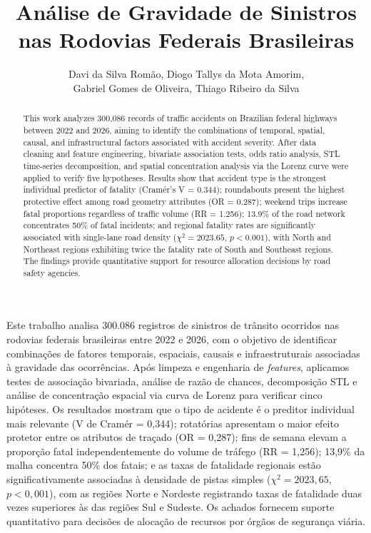 \documentclass[12pt]{article}
\title{Análise de Gravidade de Sinistros \\ 
nas Rodovias Federais Brasileiras}
\author{
  Davi da Silva Romão\inst{1},
  Diogo Tallys da Mota Amorim\inst{1},\\
  Gabriel Gomes de Oliveira\inst{1},
  Thiago Ribeiro da Silva\inst{1}
}
\begin{document}
\maketitle

\begin{abstract}
This work analyzes 300,086 records of traffic accidents on Brazilian
federal highways between 2022 and 2026, aiming to identify the
combinations of temporal, spatial, causal, and infrastructural factors
associated with accident severity. After data cleaning and feature
engineering, bivariate association tests, odds ratio analysis, STL
time-series decomposition, and spatial concentration analysis via the
Lorenz curve were applied to verify five hypotheses. Results show that
accident type is the strongest individual predictor of fatality
(Cramér's V = 0.344); roundabouts present the highest protective
effect among road geometry attributes (OR = 0.287); weekend trips
increase fatal proportions regardless of traffic volume
(RR = 1.256); 13.9\% of the road network concentrates 50\% of
fatal incidents; and regional fatality rates are significantly associated with single-lane road density ($\chi^2 = 2023.65$, $p < 0.001$), with North and Northeast regions exhibiting twice the fatality rate of South and Southeast regions.
The findings provide quantitative support for resource allocation
decisions by road safety agencies.
\end{abstract}

\begin{resumo}
Este trabalho analisa 300.086 registros de sinistros de trânsito
ocorridos nas rodovias federais brasileiras entre 2022 e 2026, com o
objetivo de identificar combinações de fatores temporais, espaciais,
causais e infraestruturais associadas à gravidade das ocorrências.
Após limpeza e engenharia de \textit{features}, aplicamos testes
de associação bivariada, análise de razão de chances, decomposição STL
e análise de concentração espacial via curva de Lorenz para verificar
cinco hipóteses. Os resultados mostram que o tipo de acidente é o
preditor individual mais relevante (V de Cramér = 0,344); rotatórias
apresentam o maior efeito protetor entre os atributos de traçado
(OR = 0,287); fins de semana elevam a proporção fatal independentemente
do volume de tráfego (RR = 1,256); 13,9\% da malha concentra 50\%
dos fatais; e as taxas de fatalidade regionais estão significativamente associadas à densidade de pistas simples ($\chi^2 = 2023,65$, $p < 0,001$), com as regiões Norte e Nordeste registrando taxas de fatalidade duas vezes superiores às das regiões Sul e Sudeste.
Os achados fornecem suporte quantitativo para decisões de alocação
de recursos por órgãos de segurança viária.
\end{resumo}
\end{document}
